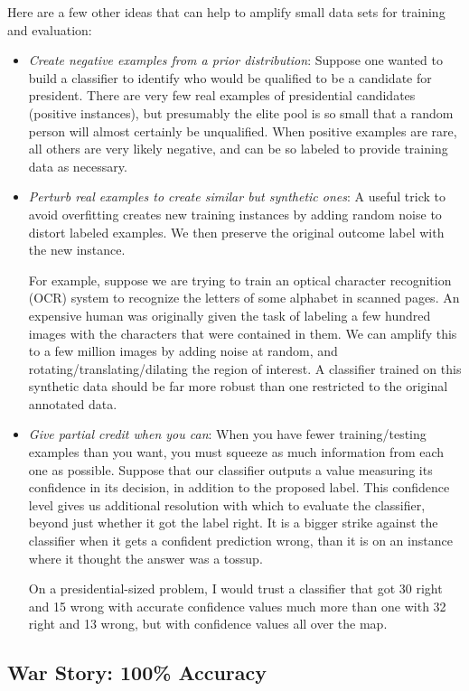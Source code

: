 \documentclass[10pt]{article}
\begin{document}
Here are a few other ideas that can help to amplify small data sets for training and evaluation:
\begin{itemize}
  \item \textit{Create negative examples from a prior distribution}: Suppose one wanted to build a classifier to identify who would be qualified to be a candidate for president. There are very few real examples of presidential candidates (positive instances), but presumably the elite pool is so small that a random person will almost certainly be unqualified. When positive examples are rare, all others are very likely negative, and can be so labeled to provide training data as necessary.
  \item \textit{Perturb real examples to create similar but synthetic ones}: A useful trick to avoid overfitting creates new training instances by adding random noise to distort labeled examples. We then preserve the original outcome label with the new instance.
  
  For example, suppose we are trying to train an optical character recognition (OCR) system to recognize the letters of some alphabet in scanned pages. An expensive human was originally given the task of labeling a few hundred images with the characters that were contained in them. We can amplify this to a few million images by adding noise at random, and rotating/translating/dilating the region of interest. A classifier trained on this synthetic data should be far more robust than one restricted to the original annotated data.
  \item \textit{Give partial credit when you can}: When you have fewer training/testing examples than you want, you must squeeze as much information from each one as possible. Suppose that our classifier outputs a value measuring its confidence in its decision, in addition to the proposed label. This confidence level gives us additional resolution with which to evaluate the classifier, beyond just whether it got the label right. It is a bigger strike against the classifier when it gets a confident prediction wrong, than it is on an instance where it thought the answer was a tossup.

  On a presidential-sized problem, I would trust a classifier that got 30 right and 15 wrong with accurate confidence values much more than one with 32 right and 13 wrong, but with confidence values all over the map.
\end{itemize}

\subsection{War Story: 100\% Accuracy}
\end{document}
